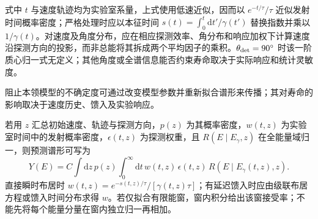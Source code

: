 式中 $t$ 与速度轨迹均为实验室系量，上式使用低速近似，因而以 $e^{-t/\tau}/\tau$ 近似发射时间概率密度；严格处理时应以本征时间 $s(t)=\int_0^t\mathrm dt'/\gamma(t')$ 替换指数并乘以 $1/\gamma(t)$。对速度及角度分布，应在相应探测效率、角分布和响应加权下计算速度沿探测方向的投影，而非总能将其拆成两个平均因子的乘积。$\theta_{\rm det}=90^\circ$ 时该一阶质心归一式无定义；其他角度或全谱信息能否约束寿命取决于实际响应和统计灵敏度。

阻止本领模型的不确定度可通过改变模型参数并重新拟合谱形来传播；其对寿命的影响取决于速度历史、馈入及实验响应。


若用 $z$ 汇总初始速度、轨迹与探测方向，$p(z)$ 为其概率密度，$w(t,z)$ 为实验室时间中的发射概率密度，$\epsilon(t,z)$ 为探测权重，且 $R(E\mid E_\gamma,z)$ 在全能量域归一，则预测谱形可写为
\[
Y(E)=C\!\int\!\mathrm dz\,p(z)\!\int_0^\infty\!\mathrm dt\,
 w(t,z)\,\epsilon(t,z)\,R\!\left(E\mid E_\gamma(t,z),z\right).
\]
直接瞬时布居时 $w(t,z)=e^{-s(t,z)/\tau}/[\gamma(t,z)\tau]$；有延迟馈入时应由级联布居方程或馈入时间分布求得 $w$。若仅拟合有限能窗，窗内积分给出该窗接受率；不能先将每个能量分量在窗内独立归一再相加。
